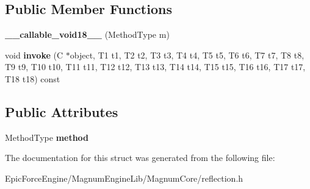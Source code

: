 \subsection*{Public Member Functions}
\begin{DoxyCompactItemize}
\item 
{\bfseries \+\_\+\+\_\+callable\+\_\+void18\+\_\+\+\_\+} (Method\+Type m)\hypertarget{structagm_1_1reflection_1_1____callable__void18_____a041cb8d8ec001f51f0e0e360f6c7b963}{}\label{structagm_1_1reflection_1_1____callable__void18_____a041cb8d8ec001f51f0e0e360f6c7b963}

\item 
void {\bfseries invoke} (C $\ast$object, T1 t1, T2 t2, T3 t3, T4 t4, T5 t5, T6 t6, T7 t7, T8 t8, T9 t9, T10 t10, T11 t11, T12 t12, T13 t13, T14 t14, T15 t15, T16 t16, T17 t17, T18 t18) const \hypertarget{structagm_1_1reflection_1_1____callable__void18_____a1acdc48a9803ee996e68a2fb9291b8ea}{}\label{structagm_1_1reflection_1_1____callable__void18_____a1acdc48a9803ee996e68a2fb9291b8ea}

\end{DoxyCompactItemize}
\subsection*{Public Attributes}
\begin{DoxyCompactItemize}
\item 
Method\+Type {\bfseries method}\hypertarget{structagm_1_1reflection_1_1____callable__void18_____a9f2276a6750809973cc30a98ffb74450}{}\label{structagm_1_1reflection_1_1____callable__void18_____a9f2276a6750809973cc30a98ffb74450}

\end{DoxyCompactItemize}


The documentation for this struct was generated from the following file\+:\begin{DoxyCompactItemize}
\item 
Epic\+Force\+Engine/\+Magnum\+Engine\+Lib/\+Magnum\+Core/reflection.\+h\end{DoxyCompactItemize}
